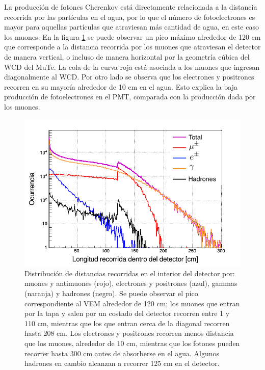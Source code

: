 \documentclass[12pt,oneside,openany,letter]{book}
\begin{document}
La producción de fotones Cherenkov está directamente relacionada a la distancia recorrida por las partículas en el agua, por lo que el número de fotoelectrones es mayor para aquellas partículas que atraviesan más cantidad de agua, en este caso los muones. En la figura \ref{track_flujo} se puede observar un pico máximo alrededor de 120 cm que corresponde a la distancia recorrida por los muones que atraviesan el detector de manera vertical, o incluso de manera horizontal por la geometr\'ia c\'ubica del WCD del MuTe. La cola de la curva roja está asociada a los muones que ingresan diagonalmente al WCD. Por otro lado se observa que los electrones y positrones recorren en su mayoría alrededor de 10 cm en el agua. Esto explica la baja producci\'on de fotoelectrones en el PMT, comparada con la producci\'on dada por los muones. 

\begin{figure}[h]
\centering
\includegraphics[scale=0.4]{images/track_flujo.png}
\caption[Distribuci\'on de distancias recorridas en el interior del detector por el flujo de partículas secundarias a nivel de la base del Cerro Machín]{Distribuci\'on de distancias recorridas en el interior del detector por: muones y antimuones (rojo), electrones y positrones (azul), gammas (naranja) y hadrones (negro). Se puede observar el pico correspondiente al VEM alrededor de 120 cm; los muones que entran por la tapa y salen por un costado del detector recorren entre 1 y 110 cm, mientras que los que entran cerca de la diagonal recorren hasta 208 cm. Los electrones y positrones recorren menos distancia que los muones, alrededor de 10 cm, mientras que los fotones pueden recorrer hasta 300 cm antes de absorberse en el agua. Algunos hadrones en cambio alcanzan a recorrer 125 cm en el detector.
\label{track_flujo} }
\end{figure}
\end{document}
